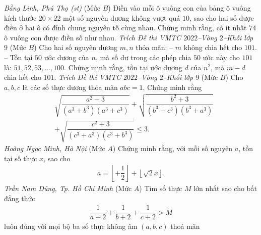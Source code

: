 \begin{multicols}{2}
\begin{center}
	\end{center}
	\vskip 0.05cm
		\hfill\textit{\small Bằng Linh, Phú Thọ (st)}
	\vskip 0.05cm
	{}
	(Mức $B$) Điền vào mỗi ô vuông con của bảng ô vuông kích thước $20\times 22$ một số nguyên dương không vượt quá $10$, sao cho hai số được điền ở hai ô có đỉnh chung nguyên tố cùng nhau. Chứng minh rằng, có ít nhất $74$ ô vuông con được điền số như nhau.
	\vskip 0.15cm
		\hfill\textit{\small Trích Đề thi VMTC $2022$--Vòng $2$--Khối lớp $9$}
	\vskip 0.15cm
	{}
	(Mức $B$) Cho hai số nguyên dương $m, n$ thỏa mãn:
	\vskip 0.05cm
	-- $m$ không chia hết cho $101$.
	\vskip 0.05cm
	-- Tồn tại $50$ ước dương của $n$, mà số dư trong các phép chia $50$ ước này cho $101$ là: $51, 52, 53, \ldots, 100.$ 
	\vskip 0.05cm
	Chứng minh rằng, tồn tại ước dương $d$ của $n^2$, mà $m-d$ chia hết cho $101$.
	\vskip 0.15cm
		\hfill\textit{\small Trích Đề thi VMTC $2022$--Vòng $2$--Khối lớp $9$}
	\vskip 0.15cm
	{}
	(Mức $B$) Cho $a, b, c$ là các số thực dương thỏa mãn $a b c=1$. Chứng minh rằng
	\begin{align*}
		&\sqrt{\dfrac{a^2\!+\!3}{\left(a^3\!+\!b^3\right)\!\left(a^3\!+\!c^3\right)}}\!+\!\sqrt{\dfrac{b^2\!+\!3}{\left(b^3\!+\!c^3\right)\!\left(b^3\!+\!a^3\right)}}\\
		&+\sqrt{\dfrac{c^2\!+\!3}{\left(c^3\!+\!a^3\right)\!\left(c^3\!+\!b^3\right)}} \leq 3.
	\end{align*}
	\vskip 0.05cm
		\hfill\textit{\small Hoàng Ngọc Minh, Hà Nội}
	\vskip 0.05cm
	{}
	(Mức $A$) Chứng minh rằng, với mỗi số nguyên $a$, tồn tại số thực $x$, sao cho  
	\begin{align*}
		a=\left\lfloor +\dfrac12\right\rfloor+\left\lfloor\sqrt{2}x\right\rfloor.
	\end{align*}
	\vskip 0.15cm
		\hfill\textit{\small Trần Nam Dũng, Tp. Hồ Chí Minh}
	\vskip 0.15cm
	{}
	(Mức $A$) Tìm số thực $M$ lớn nhất sao cho bất đẳng thức 
	\begin{align*}
		\dfrac{1}{{a + 2}} + \dfrac{1}{{b + 2}} + \dfrac{1}{{c + 2}} > M
	\end{align*}
	luôn đúng với mọi bộ ba số thực không âm $(a,b,c)$ thoả mãn  

\end{multicols}
